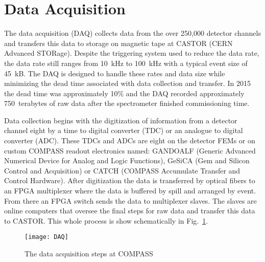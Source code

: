 \section{Data Acquisition}
The data acquisition (DAQ) collects data from the over 250,000 detector channels
and transfers this data to storage on magnetic tape at CASTOR (CERN Advanced
STORage).  Despite the triggering system used to reduce the data rate, the data
rate still ranges from 10~kHz to 100~kHz with a typical event size of 45~kB.
The DAQ is designed to handle these rates and data size while minimizing the
dead time associated with data collection and transfer. In 2015 the dead time
was approximately 10\% and the DAQ recorded approximately 750~terabytes of raw
data after the spectrometer finished commissioning time. \par

Data collection begins with the digitization of information from a detector
channel eight by a time to digital converter (TDC) or an analogue to digital
converter (ADC). These TDCs and ADCs are eight on the detector FEMs or on custom
COMPASS readout electronics named: GANDOALF (Generic Advanced Numerical Device
for Analog and Logic Functions), GeSiCA (Gem and Silicon Control and
Acquisition) or CATCH (COMPASS Accumulate Transfer and Control Hardware).  After
digitization the data is transferred by optical fibers to an FPGA multiplexer
where the data is buffered by spill and arranged by event.  From there an FPGA
switch sends the data to multiplexer slaves.  The slaves are online computers
that oversee the final steps for raw data and transfer this data to CASTOR.
This whole process is show schematically in Fig.~\ref{fig::DAQ}.

\begin{figure}[h!t]
  \centering
  \texttt{[image: DAQ]}
  \caption{The data acquisition steps at COMPASS}
  \label{fig::DAQ}
\end{figure}


